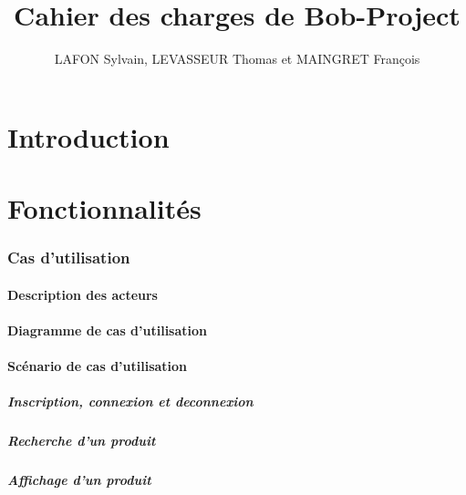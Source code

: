 \documentclass[10pt,a4paper]{article}
\title{Cahier des charges de Bob-Project}
\author{LAFON Sylvain, LEVASSEUR Thomas et MAINGRET François}
\begin{document}
	\maketitle
	\tableofcontents
	\newpage
	\part{Introduction}
		
	\newpage
	\part{Fonctionnalités}
		\section{Cas d'utilisation}
			\subsection{Description des acteurs}
				
			\subsection{Diagramme de cas d'utilisation}
			\subsection{Scénario de cas d'utilisation}
				\subsubsection{Inscription, connexion et deconnexion}
					
				\subsubsection{Recherche d'un produit}
					
				\subsubsection{Affichage d'un produit}
\end{document}
